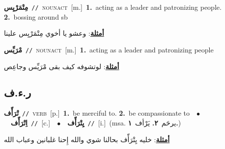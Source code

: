 \documentclass[10pt,a4paper,twoside]{article} %
\begin{document}
\begin{multicols}{2}
{\setlength\topsep{0pt}\textbf{\foreignlanguage{arabic}{مِتْمَرْيِس}}\ {\color{gray}\texttt{//}\color{black}}\ \textsc{noun\textunderscore act}\ [m.]\ \textbf{1.}~acting as a leader and patronizing people.  \textbf{2.}~bossing around sb\  \begin{flushright}\color{gray}\foreignlanguage{arabic}{\textbf{\underline{\foreignlanguage{arabic}{أمثلة}}}: وعشو يا أخوي مِتْمَرْيِس علينا}\end{flushright}\color{black}} \vspace{2mm}

{\setlength\topsep{0pt}\textbf{\foreignlanguage{arabic}{مْرَيِّس}}\ {\color{gray}\texttt{//}\color{black}}\ \textsc{noun\textunderscore act}\ [m.]\ \textbf{1.}~acting as a leader and patronizing people\  \begin{flushright}\color{gray}\foreignlanguage{arabic}{\textbf{\underline{\foreignlanguage{arabic}{أمثلة}}}: لوتشوفه كيف بقى مْرَيِّس وجاعِص}\end{flushright}\color{black}} \vspace{2mm}

\vspace{-3mm}
\subsection*{\color{blue}\foreignlanguage{arabic}{ر.ء.ف}\color{blue}{}} 

{\setlength\topsep{0pt}\textbf{\foreignlanguage{arabic}{تْرَأّف}}\ {\color{gray}\texttt{//}\color{black}}\ \textsc{verb}\ [p.]\ \textbf{1.}~be merciful to.  \textbf{2.}~be compassionate to\ \ $\bullet$\ \ \setlength\topsep{0pt}\textbf{\foreignlanguage{arabic}{اِتْرَأّف}}\ {\color{gray}\texttt{//}\color{black}}\ [c.]\ \ $\bullet$\ \ \setlength\topsep{0pt}\textbf{\foreignlanguage{arabic}{يِتْرَأّف}}\ {\color{gray}\texttt{//}\color{black}}\ [i.]\ \color{gray}(msa. \foreignlanguage{arabic}{يرحَم}~\foreignlanguage{arabic}{\textbf{٢.}}  \foreignlanguage{arabic}{يَرْأف}~\foreignlanguage{arabic}{\textbf{١.}})\color{black}\  \begin{flushright}\color{gray}\foreignlanguage{arabic}{\textbf{\underline{\foreignlanguage{arabic}{أمثلة}}}: خليه يِتْرَأّف بحالنا شوي والله إِحنا غلبانين وعباب الله}\end{flushright}\color{black}} \vspace{2mm}


\end{multicols}
\end{document}
